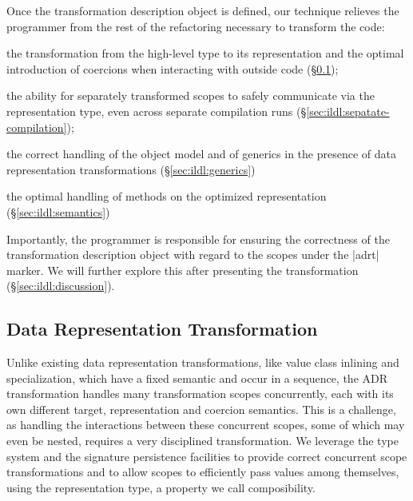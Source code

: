 Once the transformation description object is defined, our technique relieves the programmer from the rest of the refactoring necessary to transform the code:

\begin{compactitem}
\item the transformation from the high-level type to its representation and the optimal introduction of coercions when interacting with outside code (\S\ref{sec:ildl:ldl});
\item the ability for separately transformed scopes to safely communicate via the representation type, even across separate compilation runs (\S\ref{sec:ildl:sepatate-compilation});
\item the correct handling of the object model and of generics in the presence of data representation transformations (\S\ref{sec:ildl:generics})
\item the optimal handling of methods on the optimized representation (\S\ref{sec:ildl:semantics})
\end{compactitem}

Importantly, the programmer is responsible for ensuring the correctness of the transformation description object with regard to the scopes under the |adrt| marker. We will further explore this after presenting the transformation (\S\ref{sec:ildl:discussion}).












\subsection{Data Representation Transformation}
\label{sec:ildl:ldl}

Unlike existing data representation transformations, like value class inlining and specialization, which have a fixed semantic and occur in a sequence, the ADR transformation handles many transformation scopes concurrently, each with its own different target, representation and coercion semantics. This is a challenge, as handling the interactions between these concurrent scopes, some of which may even be nested, requires a very disciplined transformation. We leverage the type system and the signature persistence facilities to provide correct concurrent scope transformations and to allow scopes to efficiently pass values among themselves, using the representation type, a property we call composibility.


